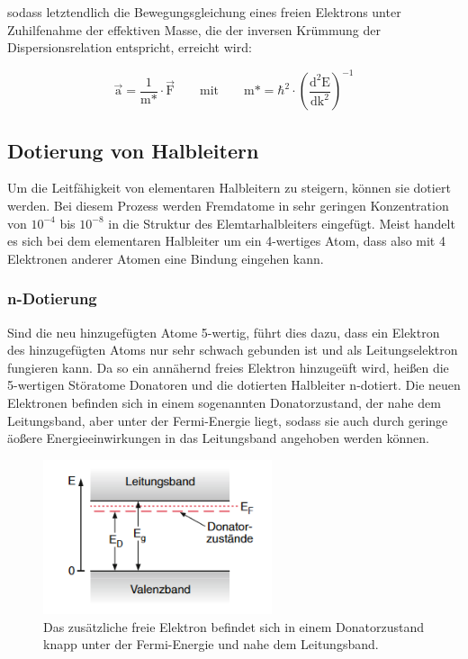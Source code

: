        sodass letztendlich die Bewegungsgleichung eines freien Elektrons unter Zuhilfenahme der effektiven Masse, die der inversen Krümmung der Dispersionsrelation entspricht, erreicht wird:

        \begin{equation*}
            \vec{\text{a}} = \frac{\text{1}}{\text{m*}} \cdot \vec{\text{F}} \qquad \text{mit} \qquad \text{m*} = \hbar^2 \cdot \left(\frac{\text{d}^2\text{E}}{\text{dk}^2}\right)^{-1}
            \label{eqn:eff_masse}
        \end{equation*}


    \subsection{Dotierung von Halbleitern}
        Um die Leitfähigkeit von elementaren Halbleitern zu steigern, können sie dotiert werden. Bei diesem Prozess werden Fremdatome in sehr geringen Konzentration von $10^{-4}$ bis $10^{-8}$ in die Struktur
        des Elemtarhalbleiters eingefügt. Meist handelt es sich bei dem elementaren Halbleiter um ein 4-wertiges Atom, dass also mit 4 Elektronen anderer Atomen eine Bindung eingehen kann. 
        
            \subsubsection*{n-Dotierung}
             Sind die neu hinzugefügten Atome 5-wertig, führt dies dazu, dass ein Elektron des hinzugefügten Atoms nur sehr schwach gebunden ist und als Leitungselektron fungieren kann. Da so ein annähernd 
             freies Elektron hinzugeüft wird, heißen die 5-wertigen Störatome Donatoren und die dotierten Halbleiter n-dotiert. Die neuen Elektronen befinden sich in einem sogenannten Donatorzustand, der nahe 
             dem Leitungsband, aber unter der Fermi-Energie liegt, sodass sie auch durch geringe äoßere Energieeinwirkungen in das Leitungsband angehoben werden können.
            
             \FloatBarrier

             \begin{figure}[h]
                \centering
                \includegraphics[width = 0.6\textwidth]{pictures/donator.png}
                \caption{Das zusätzliche freie Elektron befindet sich in einem Donatorzustand knapp unter der Fermi-Energie und nahe dem Leitungsband.}
                \label{fig:Donator}
             \end{figure}
     
